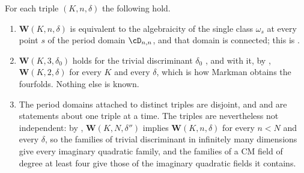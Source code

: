 \begin{proposition}\label{prop:separate}
For each triple $(K,n,\delta)$ the following hold.
\begin{enumerate}[label=\textup{(\roman*)},leftmargin=2.6em]
\item $\mathbf{W}(K,n,\delta)$ is equivalent to the algebraicity of the single
  class $\omega_{s}$ at every point $s$ of the period domain $\cD_{n,n}$, and
  that domain is connected; this is .
\item $\mathbf{W}(K,3,\delta_{0})$ holds for the trivial discriminant
  $\delta_{0}$ \cite{Mar25a,Mar25b}, and with it, by ,
  $\mathbf{W}(K,2,\delta)$ for every $K$ and every $\delta$, which is how
  Markman obtains the fourfolds. Nothing else is known.
\item The period domains attached to distinct triples are disjoint, and
   and  are statements about one
  triple at a time. The triples are nevertheless not independent: by
  , $\mathbf{W}(K,N,\delta'')$ implies
  $\mathbf{W}(K,n,\delta)$ for every $n<N$ and every $\delta$, so the families
  of trivial discriminant in infinitely many dimensions give every imaginary
  quadratic family, and the families of a CM field of degree at least four
  give those of the imaginary quadratic fields it contains.
\end{enumerate}
\end{proposition}

